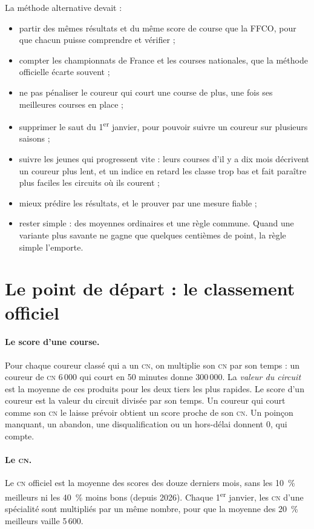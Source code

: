 \documentclass[11pt,a4paper]{article}
\newcommand{\CN}{\textsc{cn}}
\begin{document}
La méthode alternative devait :
\begin{itemize}
  \item partir des mêmes résultats et du même score de course que la FFCO, pour que chacun puisse comprendre et vérifier ;
  \item compter les championnats de France et les courses nationales, que la méthode officielle écarte souvent ;
  \item ne pas pénaliser le coureur qui court une course de plus, une fois ses meilleures courses en place ;
  \item supprimer le saut du 1\textsuperscript{er} janvier, pour pouvoir suivre un coureur sur plusieurs saisons ;
  \item suivre les jeunes qui progressent vite : leurs courses d'il y a dix mois décrivent un coureur plus lent, et un indice en retard les classe trop bas et fait paraître plus faciles les circuits où ils courent ;
  \item mieux prédire les résultats, et le prouver par une mesure fiable ;
  \item rester simple : des moyennes ordinaires et une règle commune. Quand une variante plus savante ne gagne que quelques centièmes de point, la règle simple l'emporte.
\end{itemize}

\section{Le point de départ : le classement officiel}

\paragraph{Le score d'une course.} Pour chaque coureur classé qui a un \CN, on multiplie son \CN{} par son temps : un coureur de \CN{} 6\,000 qui court en 50 minutes donne 300\,000. La \emph{valeur du circuit} est la moyenne de ces produits pour les deux tiers les plus rapides. Le score d'un coureur est la valeur du circuit divisée par son temps. Un coureur qui court comme son \CN{} le laisse prévoir obtient un score proche de son \CN. Un poinçon manquant, un abandon, une disqualification ou un hors-délai donnent 0, qui compte.

\paragraph{Le \CN.} Le \CN{} officiel est la moyenne des scores des douze derniers mois, sans les 10~\% meilleurs ni les 40~\% moins bons (depuis 2026). Chaque 1\textsuperscript{er} janvier, les \CN{} d'une spécialité sont multipliés par un même nombre, pour que la moyenne des 20~\% meilleurs vaille 5\,600.
\end{document}
